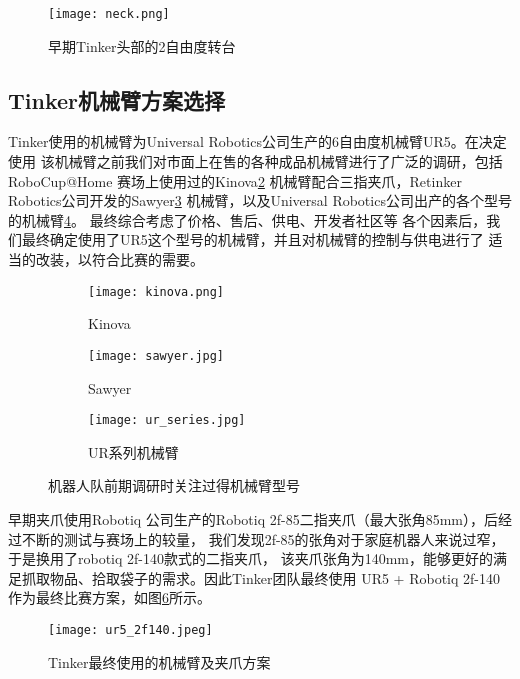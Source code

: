 \begin{figure}[ht] %
  \centering
  \texttt{[image: neck.png]}
  \caption{早期Tinker头部的2自由度转台}
  \label{fig:neck}
\end{figure}

\subsection{Tinker机械臂方案选择}

Tinker使用的机械臂为Universal Robotics公司生产的6自由度机械臂UR5。在决定使用
该机械臂之前我们对市面上在售的各种成品机械臂进行了广泛的调研，包括RoboCup@Home
赛场上使用过的Kinova\ref{fig:kinova}
机械臂配合三指夹爪，Retinker Robotics公司开发的Sawyer\ref{fig:sawyer}
机械臂，以及Universal Robotics公司出产的各个型号的机械臂\ref{fig:ur_series}。
最终综合考虑了价格、售后、供电、开发者社区等
各个因素后，我们最终确定使用了UR5这个型号的机械臂，并且对机械臂的控制与供电进行了
适当的改装，以符合比赛的需要。

\begin{figure}
\centering
\begin{subfigure}{.5\textwidth}
  \centering
  \texttt{[image: kinova.png]}
  \caption{Kinova}
  \label{fig:kinova}
\end{subfigure}%
\begin{subfigure}{.5\textwidth}
  \centering
  \texttt{[image: sawyer.jpg]}
  \caption{Sawyer}
  \label{fig:sawyer}
\end{subfigure}
\begin{subfigure}{.8\textwidth}
  \centering
  \texttt{[image: ur\_series.jpg]}
  \caption{UR系列机械臂}
  \label{fig:ur_series}
\end{subfigure}
\caption{机器人队前期调研时关注过得机械臂型号}
\label{fig:arms}
\end{figure}

早期夹爪使用Robotiq
公司生产的Robotiq 2f-85二指夹爪（最大张角85mm），后经过不断的测试与赛场上的较量，
我们发现2f-85的张角对于家庭机器人来说过窄，于是换用了robotiq 2f-140款式的二指夹爪，
该夹爪张角为140mm，能够更好的满足抓取物品、拾取袋子的需求。因此Tinker团队最终使用
UR5 + Robotiq 2f-140作为最终比赛方案，如图\ref{fig:ur5_2f140}所示。

\begin{figure}[ht] %
  \centering
  \texttt{[image: ur5\_2f140.jpeg]}
  \caption{Tinker最终使用的机械臂及夹爪方案}
  \label{fig:ur5_2f140}
\end{figure}

